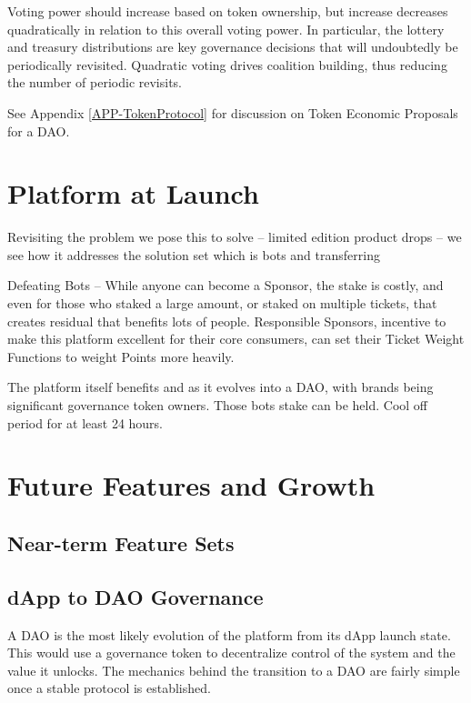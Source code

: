 \documentclass[runningheads]{llncs}
\begin{document}
Voting power should increase based on token ownership, but increase decreases quadratically in relation to this overall voting power.  In particular, the lottery and treasury distributions are key governance decisions that will undoubtedly be periodically revisited.  Quadratic voting drives coalition building, thus reducing the number of periodic revisits.
	
See Appendix \ref{APP-TokenProtocol} for discussion on Token Economic Proposals for a DAO.

\section{Platform at Launch}\label{section-PlatformAtLaunch}

Revisiting the problem we pose this to solve – limited edition product drops – we see how it addresses the solution set which is bots and transferring 

Defeating Bots – While anyone can become a Sponsor, the stake is costly, and even for those who staked a large amount, or staked on multiple tickets, that creates residual that benefits lots of people.  Responsible Sponsors, incentive to make this platform excellent for their core consumers, can set their Ticket Weight Functions to weight Points more heavily.

The platform itself benefits and as it evolves into a DAO, with brands being significant governance token owners.  Those bots stake can be held.  Cool off period for at least 24 hours.



\section{Future Features and Growth}\label{section-FutureFeaturesGrowth}

\subsection{Near-term Feature Sets}

\subsection{dApp to DAO Governance}
A DAO is the most likely evolution of the platform from its dApp launch state.  This would use a governance token to decentralize control of the system and the value it unlocks.  The mechanics behind the transition to a DAO are fairly simple once a stable protocol is established.
\end{document}
